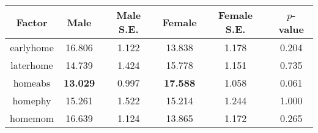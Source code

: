 \begin{longtable}{c c c c c c}
\toprule
\textbf{Factor} & \textbf{Male} & \textbf{Male S.E.}  & \textbf{Female} & \textbf{Female S.E.} & \textbf{$ p $-value} \\
\midrule
earlyhome & 16.806 & 1.122 &  13.838 & 1.178 & 0.204 \\
laterhome & 14.739 & 1.424 &  15.778 & 1.151 & 0.735 \\
homeabs &  \textbf{13.029} & 0.997 &   \textbf{17.588} & 1.058 &0.061 \\
homephy & 15.261 & 1.522 &  15.214 & 1.244 & 1.000 \\
homemom & 16.639 & 1.124 &  13.865 & 1.172 & 0.265 \\
\bottomrule
\end{longtable}
